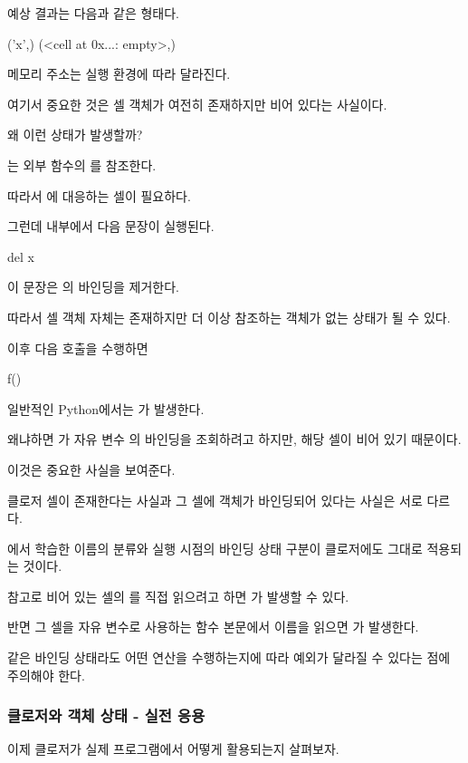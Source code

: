 예상 결과는 다음과 같은 형태다.

\begin{dhkzsh}
('x',)
(<cell at 0x...: empty>,)
\end{dhkzsh}

메모리 주소는 실행 환경에 따라 달라진다.

여기서 중요한 것은 셀 객체가 여전히 존재하지만 비어 있다는 사실이다.

왜 이런 상태가 발생할까?

는 외부 함수의 를 참조한다.

따라서 에 대응하는 셀이 필요하다.

그런데  내부에서 다음 문장이 실행된다.

\begin{dhkcode}
del x
\end{dhkcode}

이 문장은 의 바인딩을 제거한다.

따라서 셀 객체 자체는 존재하지만 더 이상 참조하는 객체가 없는 상태가 될 수 있다.

이후 다음 호출을 수행하면

\begin{dhkcode}
f()
\end{dhkcode}

일반적인 Python에서는 가 발생한다.

왜냐하면 가 자유 변수 의 바인딩을 조회하려고 하지만, 해당 셀이 비어 있기 때문이다.

이것은 중요한 사실을 보여준다.

클로저 셀이 존재한다는 사실과 그 셀에 객체가 바인딩되어 있다는 사실은 서로 다르다.

에서 학습한 이름의 분류와 실행 시점의 바인딩 상태 구분이 클로저에도 그대로 적용되는 것이다.

참고로 비어 있는 셀의 를 직접 읽으려고 하면 가 발생할 수 있다.

반면 그 셀을 자유 변수로 사용하는 함수 본문에서 이름을 읽으면 가 발생한다.

같은 바인딩 상태라도 어떤 연산을 수행하는지에 따라 예외가 달라질 수 있다는 점에 주의해야 한다.

\subsubsection{클로저와 객체 상태 - 실전 응용}

이제 클로저가 실제 프로그램에서 어떻게 활용되는지 살펴보자.

